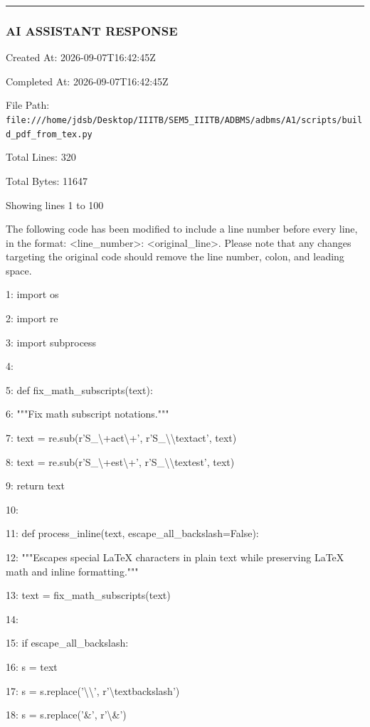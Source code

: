 \documentclass[11pt,a4paper]{article}
\begin{document}
\hrule

\subsubsection{AI ASSISTANT RESPONSE}

Created At: 2026-09-07T16:42:45Z

Completed At: 2026-09-07T16:42:45Z

File Path: \texttt{file:///home/jdsb/Desktop/IIITB/SEM5\_IIITB/ADBMS/adbms/A1/scripts/build\_pdf\_from\_tex.py}

Total Lines: 320

Total Bytes: 11647

Showing lines 1 to 100

The following code has been modified to include a line number before every line, in the format: <line\_number>: <original\_line>. Please note that any changes targeting the original code should remove the line number, colon, and leading space.

1: import os

2: import re

3: import subprocess

4:

5: def fix\_math\_subscripts(text):

6:     """Fix math subscript notations."""

7:     text = re.sub(r'S\_\textbackslash{}{+act\textbackslash{}}+', r'S\_{\textbackslash{}\textbackslash{}text{act}}', text)

8:     text = re.sub(r'S\_\textbackslash{}{+est\textbackslash{}}+', r'S\_{\textbackslash{}\textbackslash{}text{est}}', text)

9:     return text

10:

11: def process\_inline(text, escape\_all\_backslash=False):

12:     """Escapes special LaTeX characters in plain text while preserving LaTeX math and inline formatting."""

13:     text = fix\_math\_subscripts(text)

14:

15:     if escape\_all\_backslash:

16:         s = text

17:         s = s.replace('\textbackslash{}\textbackslash{}', r'\textbackslash{}textbackslash{}')

18:         s = s.replace('\&', r'\textbackslash{}\&')
\end{document}
